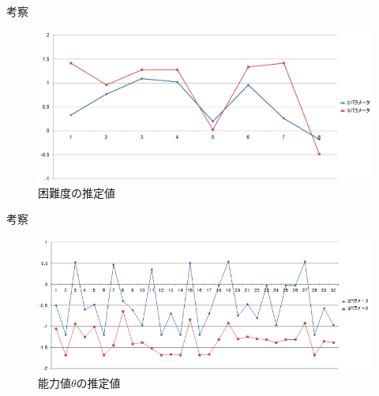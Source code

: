 \documentclass[aspectratio=169, dvipdfmx, 12pt]{beamer}
\begin{document}
\begin{frame}
  \begin{block}{考察}
    \vspace{4cm}
    \begin{figure}[H]
      \centering
      \includegraphics[bb = 1000 100 1 1,scale = 0.3]{maxmin.png}
      \vspace{1cm}
      \caption{困難度の推定値}
    \end{figure}
  \end{block}
\end{frame}

\begin{frame}
  \begin{block}{考察}
    \vspace{3.5cm}
    \begin{figure}[H]
      \centering
      \includegraphics[bb = 550 100 1 1,scale = 0.7]{maxmin_theta.png}
      \vspace{2.5cm}
      \caption{能力値$\theta$の推定値}
    \end{figure}
  \end{block}
\end{frame}
\end{document}
